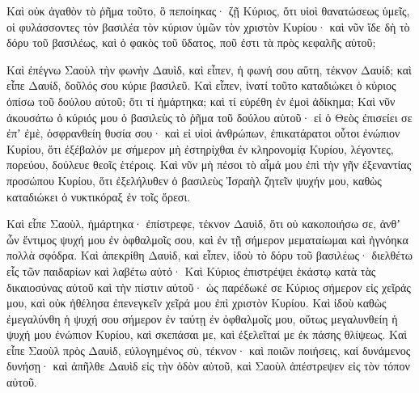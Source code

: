 {Καὶ οὐκ ἀγαθὸν τὸ ῥῆμα τοῦτο, ὃ πεποίηκας· ζῇ Κύριος, ὅτι υἱοὶ θανατώσεως ὑμεῖς, οἱ φυλάσσοντες τὸν βασιλέα τὸν κύριον ὑμῶν τὸν χριστὸν Κυρίου· καὶ νῦν ἴδε δὴ τὸ δόρυ τοῦ βασιλέως, καὶ ὁ φακὸς τοῦ ὕδατος, ποῦ ἐστι τὰ πρὸς κεφαλῆς αὐτοῦ;
\par }{\PP {}Καὶ ἐπέγνω Σαοὺλ τὴν φωνὴν Δαυὶδ, καὶ εἶπεν, ἡ φωνή σου αὕτη, τέκνον Δαυίδ; καὶ εἶπε Δαυίδ, δοῦλός σου κύριε βασιλεῦ.
Καὶ εἶπεν, ἱνατί τοῦτο καταδιώκει ὁ κύριος ὀπίσω τοῦ δούλου αὐτοῦ; ὅτι τί ἡμάρτηκα; καὶ τί εὑρέθη ἐν ἐμοὶ ἀδίκημα;
Καὶ νῦν ἀκουσάτω ὁ κύριός μου ὁ βασιλεὺς τὸ ῥῆμα τοῦ δούλου αὐτοῦ· εἰ ὁ Θεὸς ἐπισείει σε ἐπʼ ἐμὲ, ὀσφρανθείη θυσία σου· καὶ εἰ υἱοὶ ἀνθρώπων, ἐπικατάρατοι οὗτοι ἐνώπιον Κυρίου, ὅτι ἐξέβαλόν με σήμερον μὴ ἐστηρίχθαι ἐν κληρονομίᾳ Κυρίου, λέγοντες, πορεύου, δούλευε θεοῖς ἑτέροις.
Καὶ νῦν μὴ πέσοι τὸ αἷμά μου ἐπὶ τὴν γῆν ἐξεναντίας προσώπου Κυρίου, ὅτι ἐξελήλυθεν ὁ βασιλεὺς Ἰσραὴλ ζητεῖν ψυχήν μου, καθὼς καταδιώκει ὁ νυκτικόραξ ἐν τοῖς ὄρεσι.
\par }{\PP {}Καὶ εἶπε Σαοὺλ, ἡμάρτηκα· ἐπίστρεφε, τέκνον Δαυὶδ, ὅτι οὐ κακοποιήσω σε, ἀνθʼ ὧν ἔντιμος ψυχή μου ἐν ὀφθαλμοῖς σου, καὶ ἐν τῇ σήμερον μεματαίωμαι καὶ ἠγνόηκα πολλὰ σφόδρα.
Καὶ ἀπεκρίθη Δαυὶδ, καὶ εἶπεν, ἰδοὺ τὸ δόρυ τοῦ βασιλέως· διελθέτω εἷς τῶν παιδαρίων καὶ λαβέτω αὐτό·
Καὶ Κύριος ἐπιστρέψει ἑκάστῳ κατὰ τὰς δικαιοσύνας αὐτοῦ καὶ τὴν πίστιν αὐτοῦ· ὡς παρέδωκέ σε Κύριος σήμερον εἰς χεῖράς μου, καὶ οὐκ ἠθέλησα ἐπενεγκεῖν χεῖρά μου ἐπὶ χριστὸν Κυρίου.
Καὶ ἰδοὺ καθὼς ἐμεγαλύνθη ἡ ψυχή σου σήμερον ἐν ταύτῃ ἐν ὀφθαλμοῖς μου, οὕτως μεγαλυνθείη ἡ ψυχή μου ἐνώπιον Κυρίου, καὶ σκεπάσαι με, καὶ ἐξελεῖταί με ἐκ πάσης θλίψεως.
Καὶ εἶπε Σαοὺλ πρὸς Δαυὶδ, εὐλογημένος σὺ, τέκνον· καὶ ποιῶν ποιήσεις, καὶ δυνάμενος δυνήσῃ· καὶ ἀπῆλθε Δαυὶδ εἰς τὴν ὁδὸν αὐτοῦ, καὶ Σαοὺλ ἀπέστρεψεν εἰς τὸν τόπον αὐτοῦ.

}
